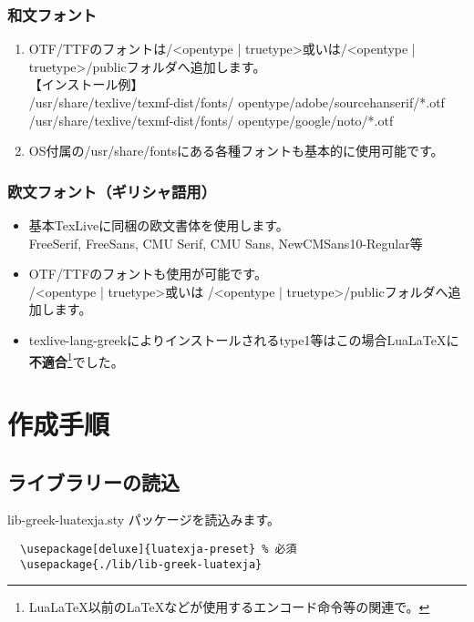 \documentclass[a4paper,10pt]{ltjsarticle}
\def\colH#1{\color[HTML]{#1}}
\begin{document}
\subsubsection{和文フォント}

\begin{enumerate}
  \item OTF/TTFのフォントは/<opentype | truetype>或いは/<opentype | truetype>/publicフォルダへ追加します。\\
【インストール例】\\
/usr/share/texlive/texmf-dist/fonts/{\colH{800000} opentype/adobe/sourcehanserif/*.otf}\\
/usr/share/texlive/texmf-dist/fonts/{\colH{800000} opentype/google/noto/*.otf}  
  \item OS付属の/usr/share/fontsにある各種フォントも基本的に使用可能です。\vspace{-2mm}
\end{enumerate}

\subsubsection{欧文フォント（ギリシャ語用）}

\begin{itemize}
  \item 基本TexLiveに同梱の欧文書体を使用します。\\
  FreeSerif, FreeSans, CMU Serif, CMU Sans, NewCMSans10-Regular等 
  \item OTF/TTFのフォントも使用が可能です。\\
  {\colH{800000} /<opentype | truetype>}或いは{\colH{800000} /<opentype | truetype>/public}フォルダへ追加します。
  \item {\Carlito texlive-lang-greek}によりインストールされるtype1等はこの場合LuaLa\TeX{}に\textbf{不適合}\footnote{LuaLa\TeX{}以前のLa\TeX{}などが使用するエンコード命令等の関連で。}でした。
\end{itemize}

\section{作成手順}

\subsection{ライブラリーの読込}
{\colH{800000} lib-greek-luatexja.sty} パッケージを読込みます。
\vspace{-2mm}
\begin{verbatim}
  \usepackage[deluxe]{luatexja-preset} % 必須
  \usepackage{./lib/lib-greek-luatexja} 
\end{verbatim}
\vspace{-6mm}
    
\end{document}
